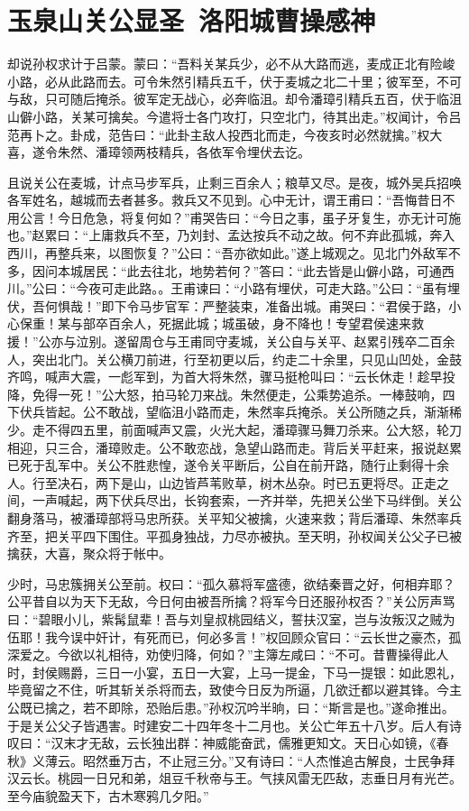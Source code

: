 \chapter{玉泉山关公显圣~洛阳城曹操感神}

却说孙权求计于吕蒙。蒙曰：“吾料关某兵少，必不从大路而逃，麦成正北有险峻小路，必从此路而去。可令朱然引精兵五千，伏于麦城之北二十里；彼军至，不可与敌，只可随后掩杀。彼军定无战心，必奔临沮。却令潘璋引精兵五百，伏于临沮山僻小路，关某可擒矣。今遣将士各门攻打，只空北门，待其出走。”权闻计，令吕范再卜之。卦成，范告曰：“此卦主敌人投西北而走，今夜亥时必然就擒。”权大喜，遂令朱然、潘璋领两枝精兵，各依军令埋伏去讫。

且说关公在麦城，计点马步军兵，止剩三百余人；粮草又尽。是夜，城外吴兵招唤各军姓名，越城而去者甚多。救兵又不见到。心中无计，谓王甫曰：“吾悔昔日不用公言！今日危急，将复何如？”甫哭告曰：“今日之事，虽子牙复生，亦无计可施也。”赵累曰：“上庸救兵不至，乃刘封、孟达按兵不动之故。何不弃此孤城，奔入西川，再整兵来，以图恢复？”公曰：“吾亦欲如此。”遂上城观之。见北门外敌军不多，因问本城居民：“此去往北，地势若何？”答曰：“此去皆是山僻小路，可通西川。”公曰：“今夜可走此路。。王甫谏曰：“小路有埋伏，可走大路。”公曰：“虽有埋伏，吾何惧哉！”即下令马步官军：严整装束，准备出城。甫哭曰：“君侯于路，小心保重！某与部卒百余人，死据此城；城虽破，身不降也！专望君侯速来救援！”公亦与泣别。遂留周仓与王甫同守麦城，关公自与关平、赵累引残卒二百余人，突出北门。关公横刀前进，行至初更以后，约走二十余里，只见山凹处，金鼓齐鸣，喊声大震，一彪军到，为首大将朱然，骤马挺枪叫曰：“云长休走！趁早投降，免得一死！”公大怒，拍马轮刀来战。朱然便走，公乘势追杀。一棒鼓响，四下伏兵皆起。公不敢战，望临沮小路而走，朱然率兵掩杀。关公所随之兵，渐渐稀少。走不得四五里，前面喊声又震，火光大起，潘璋骤马舞刀杀来。公大怒，轮刀相迎，只三合，潘璋败走。公不敢恋战，急望山路而走。背后关平赶来，报说赵累已死于乱军中。关公不胜悲惶，遂令关平断后，公自在前开路，随行止剩得十余人。行至决石，两下是山，山边皆芦苇败草，树木丛杂。时已五更将尽。正走之间，一声喊起，两下伏兵尽出，长钩套索，一齐并举，先把关公坐下马绊倒。关公翻身落马，被潘璋部将马忠所获。关平知父被擒，火速来救；背后潘璋、朱然率兵齐至，把关平四下围住。平孤身独战，力尽亦被执。至天明，孙权闻关公父子已被擒获，大喜，聚众将于帐中。

少时，马忠簇拥关公至前。权曰：“孤久慕将军盛德，欲结秦晋之好，何相弃耶？公平昔自以为天下无敌，今日何由被吾所擒？将军今日还服孙权否？”关公厉声骂曰：“碧眼小儿，紫髯鼠辈！吾与刘皇叔桃园结义，誓扶汉室，岂与汝叛汉之贼为伍耶！我今误中奸计，有死而已，何必多言！”权回顾众官曰：“云长世之豪杰，孤深爱之。今欲以礼相待，劝使归降，何如？”主簿左咸曰：“不可。昔曹操得此人时，封侯赐爵，三日一小宴，五日一大宴，上马一提金，下马一提银：如此恩礼，毕竟留之不住，听其斩关杀将而去，致使今日反为所逼，几欲迁都以避其锋。今主公既已擒之，若不即除，恐贻后患。”孙权沉吟半晌，曰：“斯言是也。”遂命推出。于是关公父子皆遇害。时建安二十四年冬十二月也。关公亡年五十八岁。后人有诗叹曰：“汉末才无敌，云长独出群：神威能奋武，儒雅更知文。天日心如镜，《春秋》义薄云。昭然垂万古，不止冠三分。”又有诗曰：“人杰惟追古解良，士民争拜汉云长。桃园一日兄和弟，俎豆千秋帝与王。气挟风雷无匹敌，志垂日月有光芒。至今庙貌盈天下，古木寒鸦几夕阳。”

